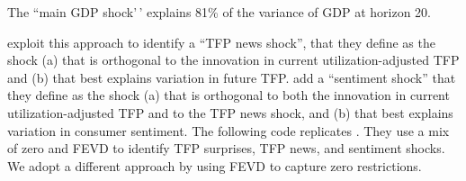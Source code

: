 \documentclass[
  12pt,
]{book}
\theoremstyle{definition}
\theoremstyle{definition}
\theoremstyle{definition}
\theoremstyle{definition}
\theoremstyle{remark}
\begin{document}
The ``main GDP shock'\,' explains 81\% of the variance of GDP at horizon 20.

\citet{BARSKY2011273} exploit this approach to identify a ``TFP news shock'', that they define as the shock (a) that is orthogonal to the innovation in current utilization-adjusted TFP and (b) that best explains variation in future TFP. \citet{Levchenko_Pandalai-Nayar_2018} add a ``sentiment shock'' that they define as the shock (a) that is orthogonal to both the innovation in current utilization-adjusted TFP and to the TFP news shock, and (b) that best explains variation in consumer sentiment. The following code replicates \citet{Levchenko_Pandalai-Nayar_2018}. They use a mix of zero and FEVD to identify TFP surprises, TFP news, and sentiment shocks. We adopt a different approach by using FEVD to capture zero restrictions.
\end{document}
